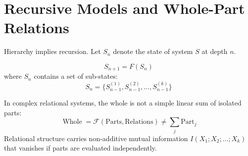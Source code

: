 \section{Recursive Models and Whole-Part Relations}
\label{sec:recursive_model}

Hierarchy implies recursion. Let $S_n$ denote the state of system $S$ at depth $n$.

\begin{definition}
\begin{equation}
S_{n+1} = F(S_n)
\end{equation}
where $S_n$ contains a set of sub-states:
\begin{equation}
S_n = \{ S_{n-1}^{(1)}, S_{n-1}^{(2)}, \ldots, S_{n-1}^{(k)} \}
\end{equation}
\end{definition}

In complex relational systems, the whole is not a simple linear sum of isolated parts:
\begin{equation}
\operatorname{Whole} = \mathcal{F}(\text{Parts}, \text{Relations}) \neq \sum_{j} \text{Part}_j
\end{equation}
Relational structure carries non-additive mutual information $I(X_1; X_2; \dots; X_k)$ that vanishes if parts are evaluated independently.
